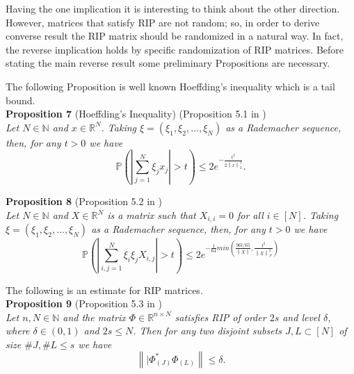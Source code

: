 \documentclass[twoside,11pt]{article}
\newcommand\norm[1]{\left\lVert#1\right\rVert}
\newcommand*\by{{\times}}
\begin{document}
\hfill\BlackBox

Having the one implication it is interesting to think about the other direction. However, matrices that satisfy RIP are not random; so, in order to derive converse result the RIP matrix should be randomized in a natural way. In fact, the reverse implication holds by specific randomization of RIP matrices. Before stating the main reverse result some preliminary Propositions are necessary. 

The following Proposition is well known Hoeffding's inequality which is a tail bound. \\

\noindent
{\bf Proposition 7} (Hoeffding's Inequality) (Proposition 5.1 in \citep{Khramer}) \\
{\it Let $N \in \mathbb{N}$ and $x \in \mathbb{R}^N$. Taking $\xi = (\xi_1, \xi_2, \dots, \xi_N)$ as a Rademacher sequence, then, for any $t > 0$ we have 
\begin{equation}
    \label{eqn:hoeffding}
    \mathbb{P}(|\sum_{j=1}^N \xi_j x_j| > t) \leq 2e^{-\frac{t^2}{2\norm{x}_2^2}}.
\end{equation}
}

\noindent
{\bf Proposition 8} (Proposition 5.2 in \citep{Khramer}) \\
{\it Let $N \in \mathbb{N}$ and $X \in \mathbb{R}^N$ is a matrix such that $X_{i, i} = 0$ for all $i \in [N]$. Taking $\xi = (\xi_1, \xi_2, \dots, \xi_N)$ as a Rademacher sequence, then, for any $t > 0$ we have 
\begin{equation}
    \label{eqn:rademacher_chaos_tail}
    \mathbb{P}(|\sum_{i,j=1}^N \xi_i \xi_j X_{i, j}| > t) \leq 2e^{-\frac{1}{64}min(\frac{96t/65}{\norm{X}}, \frac{t^2}{\norm{X}_{\mathcal{F}}^2})}
\end{equation}
}

The following is an estimate for RIP matrices. \\

\noindent
{\bf Proposition 9} (Proposition 5.3 in \citep{Khramer}) \\
{\it Let $n, N \in \mathbb{N}$ and the matrix $\Phi \in \mathbb{R}^{n \by N}$ satisfies RIP of order $2s$ and level $\delta$, where $\delta \in (0, 1)$ and $2s \leq N$. Then for any two disjoint subsets $J, L \subset [N]$ of size $\#J, \#L \leq s$ we have 
\begin{equation}
    \label{eqn:iso_bound}
    \norm{|\Phi_{(J)}^* \Phi_{(L)}} \leq \delta.
\end{equation}
}
\end{document}

